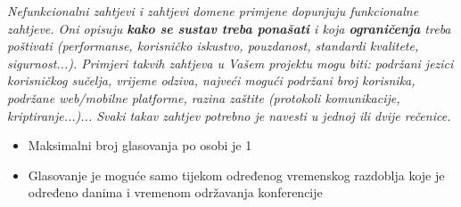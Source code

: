			 \textit{Nefunkcionalni zahtjevi i zahtjevi domene primjene dopunjuju funkcionalne zahtjeve. Oni opisuju \textbf{kako se sustav treba ponašati} i koja \textbf{ograničenja} treba poštivati (performanse, korisničko iskustvo, pouzdanost, standardi kvalitete, sigurnost...). Primjeri takvih zahtjeva u Vašem projektu mogu biti: podržani jezici korisničkog sučelja, vrijeme odziva, najveći mogući podržani broj korisnika, podržane web/mobilne platforme, razina zaštite (protokoli komunikacije, kriptiranje...)... Svaki takav zahtjev potrebno je navesti u jednoj ili dvije rečenice.}
			 \begin{itemize}
			 	\item Maksimalni broj glasovanja po osobi je 1
			 	\item Glasovanje je moguće samo tijekom određenog vremenskog razdoblja koje je određeno danima i vremenom održavanja konferencije
			 \end{itemize}
			 
			 
			 
	